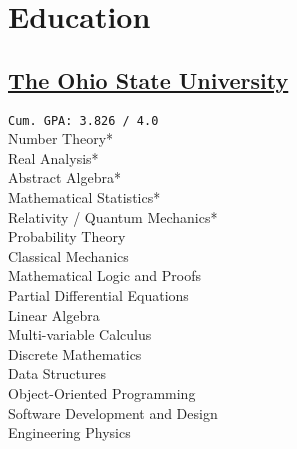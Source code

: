 \documentclass[]{farhan-resume-openfont}
\begin{document}
%
%
%
%

%
%

\begin{minipage}[t]{0.25\textwidth}

    \section{Education}

    \subsection{\href{https://www.osu.edu/}{The Ohio State University}}
    \texttt{Cum. GPA: 3.826 / 4.0} \\
    Number Theory* \\
    Real Analysis* \\
    Abstract Algebra* \\
    Mathematical Statistics* \\
    Relativity / Quantum Mechanics* \\
    Probability Theory \\
    Classical Mechanics \\
    Mathematical Logic and Proofs \\
    Partial Differential Equations \\
    Linear Algebra\\
    Multi-variable Calculus\\
    Discrete Mathematics\\
    Data Structures \\
    Object-Oriented Programming\\
    Software Development and Design\\
    Engineering Physics\\


\end{minipage}
\end{document}
